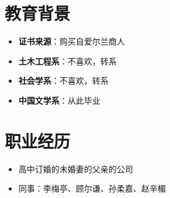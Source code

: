 \documentclass{resume}
\begin{document}





\section{教育背景}

\begin{itemize} [parsep=1ex]
  \item \textbf{证书来源}：购买自爱尔兰商人
\end{itemize}
\begin{itemize} [parsep=1ex]
  \item \textbf{土木工程系}：不喜欢，转系
  \item \textbf{社会学系}：不喜欢，转系
  \item \textbf{中国文学系}：从此毕业
\end{itemize}

\section{职业经历}

\begin{itemize}[parsep=0.5ex]
  \item 高中订婚的未婚妻的父亲的公司
\end{itemize}

\begin{itemize}[parsep=0.5ex]
  \item 同事：李梅亭、顾尔谦、孙柔嘉、赵辛楣
\end{itemize}
\end{document}
